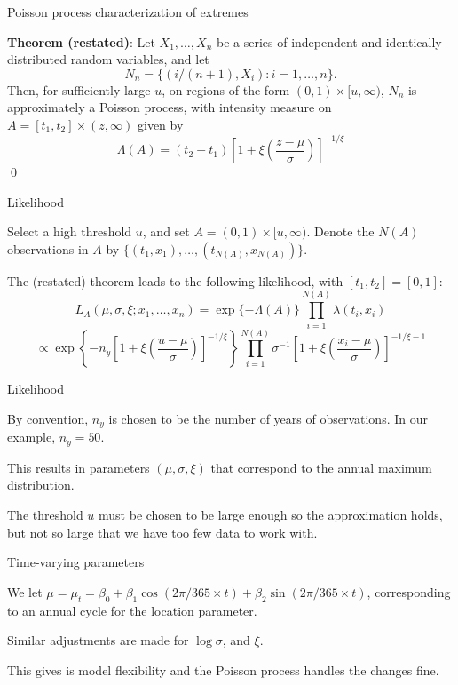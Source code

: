 \documentclass[mathserif, 11pt, t]{beamer}
\begin{document}
\begin{frame}{Poisson process characterization of extremes}

\textbf{Theorem (restated)}: Let $X_1,\ldots,X_n$ be a series of independent and identically distributed random variables, and let 
\[ N_n = \{(i/(n+1),X_i):i=1,\ldots,n\}. \]
Then, for sufficiently large $u$, on regions of the form $(0,1)\times[u,\infty)$, $N_n$ is approximately a Poisson process, with intensity measure on $A=[t_1,t_2]\times(z,\infty)$ given by
\[ \Lambda(A)=(t_2-t_1)\left[1+\xi\left(\frac{z-\mu}{\sigma}\right)\right]^{-1/\xi} \]
\qed
\end{frame}

\begin{frame}{Likelihood}

Select a high threshold $u$, and set $A=(0,1)\times[u,\infty)$. Denote the $N(A)$ observations in $A$ by $\{(t_1,x_1),\ldots,(t_{N(A)},x_{N(A)})\}$.
\bigskip

The (restated) theorem leads to the following likelihood, with $[t_1,t_2]=[0,1]$:
\[ L_A(\mu,\sigma,\xi; x_1,\ldots,x_n) = \exp\{-\Lambda(A)\}\prod_{i=1}^{N(A)}\lambda(t_i,x_i) \]
\[ \propto \exp\left\{-n_y\left[1+\xi\left(\frac{u-\mu}{\sigma}\right)\right]^{-1/\xi}\right\}\prod_{i=1}^{N(A)}\sigma^{-1}\left[1+\xi\left(\frac{x_i-\mu}{\sigma}\right)\right]^{-1/\xi-1} \]

\end{frame}

\begin{frame}{Likelihood}

By convention, $n_y$ is chosen to be the number of years of observations. In our example, $n_y=50$.
\bigskip

This results in parameters $(\mu,\sigma,\xi)$ that correspond to the annual maximum distribution.
\bigskip

The threshold $u$ must be chosen to be large enough so the approximation holds, but not so large that we have too few data to work with.

\end{frame}


\begin{frame}{Time-varying parameters}

We let $\mu=\mu_t = \beta_0 + \beta_1\cos(2\pi/365\times t) + \beta_2\sin(2\pi/365\times t)$, corresponding to an annual cycle for the location parameter.
\bigskip

Similar adjustments are made for $\log \sigma$, and $\xi$.
\bigskip

This gives is model flexibility and the Poisson process handles the changes fine.

\end{frame}
\end{document}
